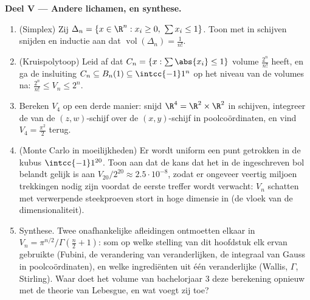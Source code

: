 \begin{problem}[{Weekendopgave --- $V_n =
\pi^{n/2}/\Gamma(\frac n2 + 1)$, en de vreemdheid van hoge
dimensies}]
\medskip
\noindent\textbf{Deel V --- Andere lichamen, en synthese.}
\begin{enumerate}[resume]
  \item (Simplex) Zij $\Delta_n = \{x \in \R^n : x_i \geq 0,\ \sum
        x_i \leq 1\}$. Toon met in schijven snijden en inductie aan
        dat $\operatorname{vol}(\Delta_n) = \frac1{n!}$.
  \item (Kruispolytoop) Leid af dat $C_n = \{x : \sum\abs{x_i} \leq
        1\}$ volume $\frac{2^n}{n!}$ heeft, en ga de insluiting
        $C_n \subseteq B_n(1) \subseteq \intcc{-1}1^n$ op het
        niveau van de volumes na: $\frac{2^n}{n!} \leq V_n \leq
        2^n$.
  \item Bereken $V_4$ op een derde manier: snijd $\R^4 = \R^2
        \times \R^2$ in schijven, integreer de  van de
        $(z, w)$-schijf over de $(x, y)$-schijf in poolcoördinaten,
        en vind $V_4 = \frac{\pi^2}2$ terug.
  \item (Monte Carlo in moeilijkheden) Er wordt uniform een punt
        getrokken in de kubus $\intcc{-1}1^{20}$. Toon aan dat de
        kans dat het in de ingeschreven bol belandt gelijk is aan
        $V_{20}/2^{20} \approx 2.5\cdot10^{-8}$, zodat er ongeveer
        veertig miljoen trekkingen nodig zijn voordat de eerste
        treffer wordt verwacht: $V_n$ schatten met verwerpende
        steekproeven stort in hoge dimensie in (de vloek van de
        dimensionaliteit).
  \item Synthese. Twee onafhankelijke afleidingen ontmoetten elkaar
        in $V_n = \pi^{n/2}/\Gamma(\frac n2 + 1)$: som op welke
        stelling van dit hoofdstuk elk ervan gebruikte (Fubini, de
        verandering van veranderlijken, de integraal van Gauss in
        poolcoördinaten), en welke ingrediënten uit één
        veranderlijke (Wallis, $\Gamma$, Stirling). Waar doet het
        volume van bachelorjaar 3 deze berekening opnieuw met de
        theorie van Lebesgue, en wat voegt zij toe?
\end{enumerate}
\end{problem}
